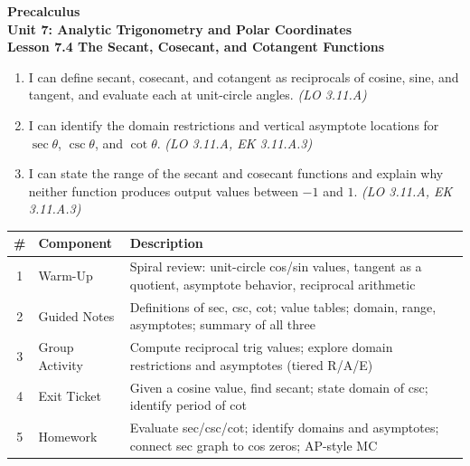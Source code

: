 \documentclass[10pt]{article}
\begin{document}
\vspace{-0.8in}

\begin{center}
  {\color{white}\textbf{\LARGE Precalculus}}\\[4pt]
  {\color{skymid}\large\textbf{Unit 7: Analytic Trigonometry and Polar Coordinates}}\\[6pt]
  {\color{white}\textbf{\large Lesson 7.4 \quad The Secant, Cosecant, and Cotangent Functions}}
\end{center}

\vspace{0.22in}
\namedateperiod
\vspace{0.18in}

\begin{learningtargetbox}
\small
\begin{enumerate}[leftmargin=1.5em, itemsep=5pt]
  \item I can define secant, cosecant, and cotangent as reciprocals of cosine,
    sine, and tangent, and evaluate each at unit-circle angles.
    \hfill\textit{(LO 3.11.A)}
  \item I can identify the domain restrictions and vertical asymptote locations
    for $\sec\theta$, $\csc\theta$, and $\cot\theta$.
    \hfill\textit{(LO 3.11.A, EK 3.11.A.3)}
  \item I can state the range of the secant and cosecant functions and explain
    why neither function produces output values between $-1$ and $1$.
    \hfill\textit{(LO 3.11.A, EK 3.11.A.3)}
\end{enumerate}
\end{learningtargetbox}

\vspace{0.14in}

\begin{tocbox}
\small
\renewcommand{\arraystretch}{1.5}
\begin{tabularx}{\linewidth}{@{} c l X @{}}
\rowcolor{sky}
\textbf{\#} & \textbf{Component} & \textbf{Description} \\
\midrule
1 & Warm-Up        & Spiral review: unit-circle cos/sin values, tangent as a quotient, asymptote behavior, reciprocal arithmetic \\
2 & Guided Notes   & Definitions of sec, csc, cot; value tables; domain, range, asymptotes; summary of all three \\
3 & Group Activity & Compute reciprocal trig values; explore domain restrictions and asymptotes (tiered R/A/E) \\
4 & Exit Ticket    & Given a cosine value, find secant; state domain of csc; identify period of cot \\
5 & Homework       & Evaluate sec/csc/cot; identify domains and asymptotes; connect sec graph to cos zeros; AP-style MC \\
\end{tabularx}
\end{tocbox}
\end{document}
